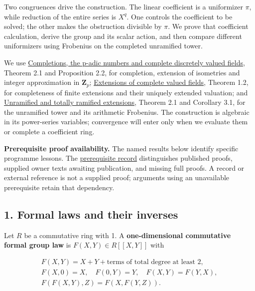 \documentclass[11pt,a4paper]{article}
\begin{document}
Two congruences drive the construction. The linear coefficient is a
uniformizer \(\pi\), while reduction of the entire series is \(X^q\).
One controls the coefficient to be solved; the other makes the
obstruction divisible by \(\pi\). We prove that coefficient calculation,
derive the group and its scalar action, and then compare different
uniformizers using Frobenius on the completed unramified tower.

We use
\href{https://kokunoyumeto.github.io/open-math-courses/courses/NT-CFT/proof-dependencies.html\#NT-LOC-02}{Completions,
the p-adic numbers and complete discretely valued fields}, Theorem 2.1
and Proposition 2.2, for completion, extension of isometries and integer
approximation in \(\mathbf Z_p\);
\href{https://kokunoyumeto.github.io/open-math-courses/courses/NT-CFT/proof-dependencies.html\#NT-LOC-04}{Extensions
of complete valued fields}, Theorem 1.2, for completeness of finite
extensions and their uniquely extended valuation; and
\href{https://kokunoyumeto.github.io/open-math-courses/courses/NT-CFT/proof-dependencies.html\#NT-LOC-07}{Unramified
and totally ramified extensions}, Theorem 2.1 and Corollary 3.1, for the
unramified tower and its arithmetic Frobenius. The construction is
algebraic in its power-series variables; convergence will enter only
when we evaluate them or complete a coefficient ring.

\textbf{Prerequisite proof availability.} The named results below
identify specific programme lessons. The
\href{https://kokunoyumeto.github.io/open-math-courses/courses/NT-CFT/proof-dependencies.html\#lesson-7}{prerequisite
record} distinguishes published proofs, supplied owner texts awaiting
publication, and missing full proofs. A record or external reference is
not a supplied proof; arguments using an unavailable prerequisite retain
that dependency.

\subsection{1. Formal laws and their
inverses}\label{formal-laws-and-their-inverses}

Let \(R\) be a commutative ring with 1. A \textbf{one-dimensional
commutative formal group law} is \(F(X,Y)\in R[[X,Y]]\) with

\[
\begin{gathered}
F(X,Y)=X+Y+\text{terms of total degree at least 2},\\
F(X,0)=X,\quad F(0,Y)=Y,\quad F(X,Y)=F(Y,X),\\
F(F(X,Y),Z)=F(X,F(Y,Z)).
\end{gathered}
\tag{1}
\]
\end{document}
